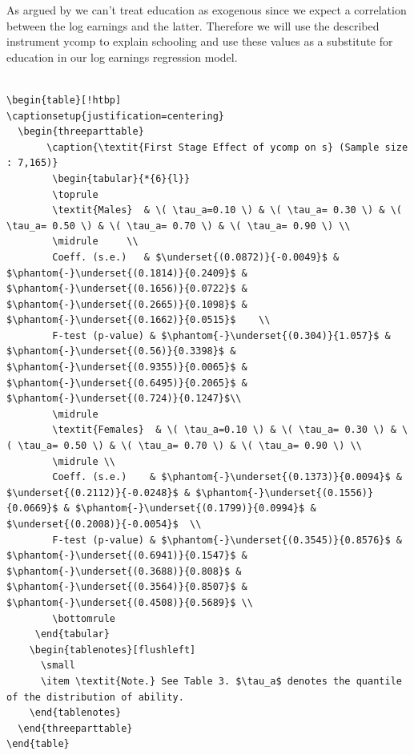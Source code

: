 \documentclass[12pt,a4paper]{article}
\begin{document}
As argued by \textcite{brunello} we can't treat education as exogenous
since we expect a correlation between the log earnings and the latter.
Therefore we will use the described instrument ycomp to explain
schooling and use these values as a substitute for education in our log
earnings regression model.

\begin{verbatim}

\begin{table}[!htbp]
\captionsetup{justification=centering}
  \begin{threeparttable}
       \caption{\textit{First Stage Effect of ycomp on s} (Sample size : 7,165)}
        \begin{tabular}{*{6}{l}}
        \toprule 
        \textit{Males}  & \( \tau_a=0.10 \) & \( \tau_a= 0.30 \) & \( \tau_a= 0.50 \) & \( \tau_a= 0.70 \) & \( \tau_a= 0.90 \) \\
        \midrule     \\
        Coeff. (s.e.)   & $\underset{(0.0872)}{-0.0049}$ & $\phantom{-}\underset{(0.1814)}{0.2409}$ & $\phantom{-}\underset{(0.1656)}{0.0722}$ & $\phantom{-}\underset{(0.2665)}{0.1098}$ & $\phantom{-}\underset{(0.1662)}{0.0515}$    \\
        F-test (p-value) & $\phantom{-}\underset{(0.304)}{1.057}$ & $\phantom{-}\underset{(0.56)}{0.3398}$ & $\phantom{-}\underset{(0.9355)}{0.0065}$ & $\phantom{-}\underset{(0.6495)}{0.2065}$ & $\phantom{-}\underset{(0.724)}{0.1247}$\\
        \midrule 
        \textit{Females}  & \( \tau_a=0.10 \) & \( \tau_a= 0.30 \) & \( \tau_a= 0.50 \) & \( \tau_a= 0.70 \) & \( \tau_a= 0.90 \) \\
        \midrule \\
        Coeff. (s.e.)    & $\phantom{-}\underset{(0.1373)}{0.0094}$ & $\underset{(0.2112)}{-0.0248}$ & $\phantom{-}\underset{(0.1556)}{0.0669}$ & $\phantom{-}\underset{(0.1799)}{0.0994}$ & $\underset{(0.2008)}{-0.0054}$  \\
        F-test (p-value) & $\phantom{-}\underset{(0.3545)}{0.8576}$ & $\phantom{-}\underset{(0.6941)}{0.1547}$ & $\phantom{-}\underset{(0.3688)}{0.808}$ & $\phantom{-}\underset{(0.3564)}{0.8507}$ & $\phantom{-}\underset{(0.4508)}{0.5689}$ \\
        \bottomrule
     \end{tabular}
    \begin{tablenotes}[flushleft]
      \small
      \item \textit{Note.} See Table 3. $\tau_a$ denotes the quantile of the distribution of ability.
    \end{tablenotes}
  \end{threeparttable}
\end{table}
\end{verbatim}
\end{document}
